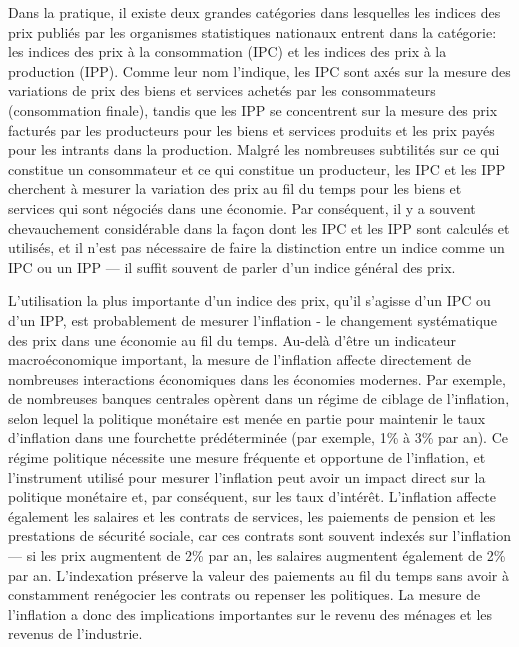 \documentclass[]{article}
\begin{document}
Dans la pratique, il existe deux grandes catégories dans lesquelles les indices des prix publiés par les organismes statistiques nationaux entrent dans la catégorie: les indices des prix à la consommation (IPC) et les indices des prix à la production (IPP). Comme leur nom l'indique, les IPC sont axés sur la mesure des variations de prix des biens et services achetés par les consommateurs (consommation finale), tandis que les IPP se concentrent sur la mesure des prix facturés par les producteurs pour les biens et services produits et les prix payés pour les intrants dans la production. Malgré les nombreuses subtilités sur ce qui constitue un consommateur et ce qui constitue un producteur, les IPC et les IPP cherchent à mesurer la variation des prix au fil du temps pour les biens et services qui sont négociés dans une économie. Par conséquent, il y a souvent
chevauchement considérable dans la façon dont les IPC et les IPP sont calculés et utilisés, et il n'est pas nécessaire de faire la distinction entre un indice comme un IPC ou un IPP --- il suffit souvent de parler d'un indice général des prix.

L'utilisation la plus importante d'un indice des prix, qu'il s'agisse d'un IPC ou d'un IPP, est probablement de mesurer l'inflation - le changement systématique des prix dans une économie au fil du temps. Au-delà d'être un indicateur macroéconomique important, la mesure de l'inflation affecte directement de nombreuses interactions économiques dans les économies modernes. Par exemple, de nombreuses banques centrales opèrent dans un régime de ciblage de l'inflation, selon lequel la politique monétaire est menée en partie pour maintenir le taux d'inflation dans une fourchette prédéterminée (par exemple, 1\% à 3\% par an). Ce régime politique nécessite une mesure fréquente et opportune de l'inflation, et l'instrument utilisé pour mesurer l'inflation peut avoir un impact direct sur la politique monétaire et, par conséquent, sur les taux d'intérêt. L'inflation affecte également les salaires et les contrats de services, les paiements de pension et les prestations de sécurité sociale, car ces contrats sont souvent indexés sur l'inflation --- si les prix augmentent de 2\% par an, les salaires augmentent également de 2\% par an. L'indexation préserve la valeur des paiements au fil du temps sans avoir à constamment renégocier les contrats ou repenser les politiques. La mesure de l'inflation a donc des implications importantes sur le revenu des ménages et les revenus de l'industrie.
\end{document}
